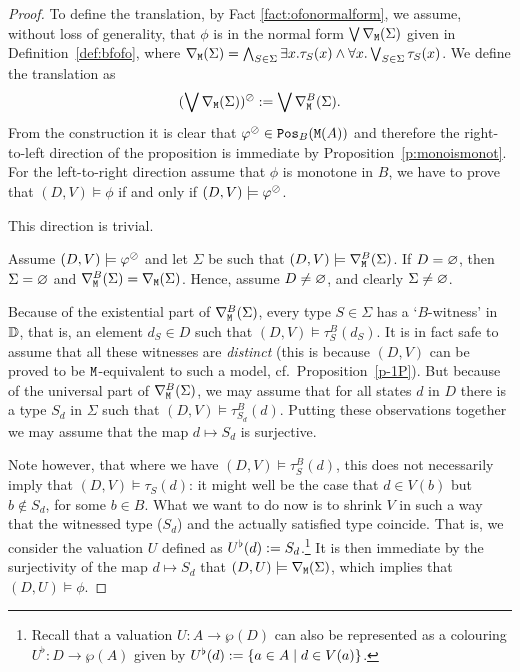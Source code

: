 \begin{proof}
To define the translation, by Fact \ref{fact:ofonormalform}, we assume, without loss of generality, that $\phi$
is in the normal form $\bigvee \dbnfofo{\Sigma}$ given in 
Definition~\ref{def:bfofo}, where
$\dbnfofo{\Sigma} = 
\bigwedge_{S\in\Sigma} \exists x. \tau_S(x) \land 
  \forall x. \bigvee_{S\in\Sigma} \tau_S(x)$.
We define the translation as
\[
(\bigvee \dbnfofo{\Sigma})^\tmono\isdef  \bigvee \mondbnfofo{\Sigma}{B}.
\]
From the construction it is clear that $\phi^\tmono \in \monot{\ofo(A)}{B}$ 
and therefore the right-to-left direction of the proposition is immediate by 
Proposition~\ref{p:monoismonot}. 
For the left-to-right direction assume that $\phi$ is monotone in $B$, we 
have to prove that $(D,V) \models \phi$ if and only if $(D,V) \models 
\phi^\tmono$.

\bigskip
\noindent \fbox{$\Rightarrow$} This direction is trivial.

\bigskip
\noindent \fbox{$\Leftarrow$} Assume $(D,V) \models \phi^\tmono$ and let 
$\Sigma$ be such that $(D,V) \models \mondbnfofo{\Sigma}{B}$. 
If $D = \nada$, then $\Sigma = \nada$ and $\mondbnfofo{\Sigma}{B}= 
\dbnfofo{\Sigma}$. 
Hence, assume $D \neq \nada$, and clearly $\Sigma \neq \nada$.

Because of the existential part of $\mondbnfofo{\Sigma}{B}$, every type $S \in
\Sigma$ has a `$B$-witness' in $\osmodel$, that is, an element $d_{S} \in D$
such that $(D,V) \models \tau^{B}_{S}(d_{S})$.
It is in fact safe to assume that all these witnesses are \emph{distinct}
(this is because $(D,V)$ can be proved to be $\ofo$-equivalent to such a model,
cf.~Proposition~\ref{p-1P}).
But because of the universal part of $\mondbnfofo{\Sigma}{B}$, we may assume
that for all states $d$ in $D$ there is a type $S_{d}$ in $\Sigma$ such that
$(D,V) \models \tau^{B}_{S_{d}}(d)$.
Putting these observations together we may assume that the map $d \mapsto S_{d}$
is surjective.

Note however, that where we have $(D,V) \models \tau^{B}_{S}(d)$, this does not 
necessarily imply that $(D,V) \models \tau_{S}(d)$: it might well be the case
that $d \in V(b)$ but $b \not\in S_{d}$, for some $ b \in B$.
What we want to do now is to shrink $V$ in such a way that the witnessed type
($S_d$) and the actually satisfied type coincide.
That is, we consider the valuation $U$ defined as $U^{\flat}(d) \isdef 
S_d$.\footnote{%
   Recall that a valuation $U:A\to\wp(D)$ can also be represented as a 
   colouring $U^{\flat}: D\to\wp(A)$ given by $U^{\flat}(d) \isdef 
   \{a \in A \mid d\in V(a)\}$.
   } 
It is then immediate by the surjectivity of the map $d \mapsto S_{d}$ that 
$(D,U) \models \dbnfofo{\Sigma}$, which implies that $(D,U) \models \phi$.


\end{proof}
